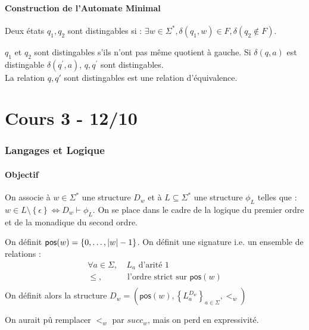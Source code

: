 \documentclass{cours}
\begin{document}
\subsection{Construction de l'Automate Minimal}
\begin{definition}
    Deux états $q_{1}, q_{2}$ sont distingables si : $\exists w \in \Sigma^{*}, \delta(q_{1}, w) \in F, \delta(q_{2} \notin F)$. 
\end{definition}
\begin{proposition}
    $q_{1}$ et $q_{2}$ sont distingables s'ils n'ont pas même quotient à gauche. Si $\delta(q, a)$ est distingable $\delta(q^{'}, a)$, $q, q^{'}$ sont distingables.\\
    La relation $q, q'$ sont distingables est une relation d'équivalence. 
\end{proposition}

\part[Logique Monadique]{Cours 3 - 12/10}
\section{Langages et Logique}
\subsection{Objectif}
On associe à $w \in \Sigma^{*}$ une structure $D_{w}$ et à $L \subseteq \Sigma^{*}$ une structure $\phi_{L}$ telles que : $w \in L\setminus \left\{\epsilon\right\} \Leftrightarrow D_{w} \vdash \phi_{L}$. On se place dans le cadre de la logique du premier ordre et de la monadique du second ordre.\\

\begin{definition}
    On définit $\textsf{pos}(w) = \left\{0, \ldots, \left|w\right| - 1\right\}$. On définit une signature i.e. un ensemble de relations : 
\[
    \begin{aligned}
        \forall a \in \Sigma,& \ L_{a} \text{ d'arité } 1\\
        \leq, & \text{ l'ordre strict sur } \textsf{pos}(w)\\
    \end{aligned}   
\]    
On définit alors la structure $D_{w} = \left(\textsf{pos}(w), \left\{L_{a}^{D_{w}}\right\}_{a \in \Sigma}, <_{w}\right)$
\end{definition}
\begin{remark}
    On aurait pû remplacer $<_{w}$ par $succ_{w}$, mais on perd en expressivité. 
\end{remark}
\end{document}
